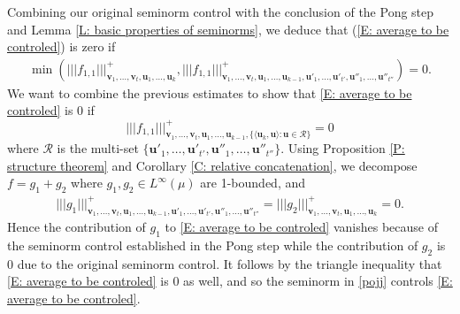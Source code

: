 \documentclass[11pt]{amsart}
\theoremstyle{definition}
\DeclareMathOperator*{\E}{\mathbb{E}}
\newcommand{\CZ}{{\mathcal Z}}
\newcommand{\bu}{{\mathbf{u}}}
\newcommand{\bv}{{\mathbf{v}}}
\newcommand{\nnorm}[1]{\lvert\!|\!| #1|\!|\!\rvert}
\newcommand{\1}{{\mathbf{1}}}
\begin{document}
      Combining our original seminorm control with the conclusion of the Pong step and Lemma \ref{L: basic properties of seminorms}, we deduce that     
       (\ref{E: average to be controled}) is zero if
       \begin{align*}
           \min(\nnorm{f_{1,1}}^{+}_{\bv_{1},\dots,\bv_{t},\bu_{1},\dots,\bu_k}, \nnorm{f_{1,1}}^{+}_{\bv_{1},\dots,\bv_{t},\bu_{1},\dots,\bu_{k-1},\bu'_{1},\dots,\bu'_{t'},\bu''_{1},\dots,\bu''_{t''}}) = 0.
       \end{align*}
    We want to combine the previous estimates to show that \eqref{E: average to be controled} is 0 if 
       \begin{equation}\label{pojj}
           \nnorm{f_{1,1}}^{+}_{\bv_{1},\dots,\bv_{t},\bu_{1},\dots,\bu_{k-1},\{\langle \bu_k, \bu\rangle: \bu\in\mathcal{R}\}} = 0
       \end{equation}
 where $\mathcal{R}$ is the multi-set $\{\bu'_{1},\dots,\bu'_{t'},\bu''_{1},\dots,\bu''_{t''}\}$. Using Proposition \ref{P: structure theorem}
 and Corollary \ref{C: relative concatenation}, we decompose $f = g_1 + g_2$ where $g_1, g_2\in L^\infty(\mu)$ are 1-bounded, and 
     \begin{align*}
     \nnorm{g_1}^+_{\bv_{1},\dots,\bv_{t},\bu_{1},\dots,\bu_{k-1},\bu'_{1},\dots,\bu'_{t'},\bu''_{1},\dots,\bu''_{t''}} =  \nnorm{g_2}^+_{\bv_{1},\dots,\bv_{t},\bu_{1},\dots,\bu_k} = 0.
     \end{align*}
      Hence the contribution of $g_1$ to \eqref{E: average to be controled} vanishes because of the seminorm control established in the Pong step while the contribution of $g_2$ is 0 due to the original seminorm control. It follows by the triangle inequality that \eqref{E: average to be controled} is 0 as well, and so the seminorm in \eqref{pojj} controls \eqref{E: average to be controled}.
      
\end{document}
